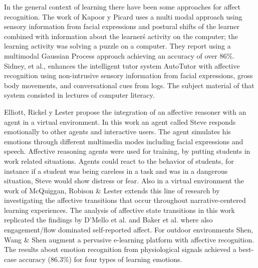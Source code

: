 \documentclass[a4paper,twoside]{article}
\begin{document}
In the general context of learning there have been some approaches for affect
recognition. The work of Kapoor y Picard \cite{kapoor2005multimodal} uses a multi modal
approach using sensory information from facial expressions and postural shifts
of the learner combined with information about the learner\'s activity on the
computer; the learning activity was solving a puzzle on a computer. They report
using a multimodal Gaussian Process approach achieving an accuracy of over 86\%.
Sidney, et al., \cite{sidney2005integrating} enhances the intelligent tutor system AutoTutor with
affective recognition using non-intrusive sensory information from facial
expressions, gross body movements, and conversational cues from logs.  The
subject material of that system consisted in lectures of computer
literacy.

Elliott, Rickel y Lester \cite{elliott1999lifelike,d2008autotutor} propose the integration of an affective reasoner
with an agent in a virtual environment. In this work an agent called Steve
responds emotionally to other agents and interactive users. The agent simulates
his emotions through different multimedia modes including facial expressions and
speech. Affective reasoning agents were used for training, by putting students
in work related situations. Agents could react to the behavior of students, for
instance if a student was being careless in a task and was in a dangerous
situation, Steve would show distress or fear. Also in a virtual environment the
work of McQuiggan, Robison \& Lester \cite{mcquiggan2010affective} extends this line of research by
investigating the affective transitions that occur throughout narrative-centered
learning experiences. The analysis of affective state transitions in this work
replicated the findings by D’Mello et al. \cite{d2008autotutor} and Baker et al. 
\cite{rodrigo2009affective} where
also engagement/flow dominated self-reported affect. For outdoor environments
Shen, Wang \& Shen \cite{shen2009affective} augment a pervasive e-learning platform with affective
recognition.  The results about emotion recognition from physiological signals
achieved a best-case accuracy (86.3\%) for four types of learning emotions.
\end{document}
